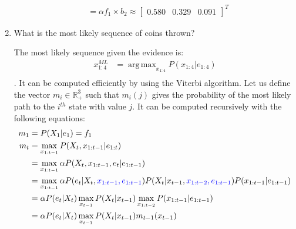 \documentclass[9pt,a4paper]{extarticle}
\DeclareMathOperator*{\argmax}{arg\,max}
\newenvironment{solution}
    {%
    \color{red}
    }
    { 
    \color{black}
    }
\begin{document}
\begin{enumerate}
\begin{solution}
\begin{align}
           &= \alpha f_1\times b_2  \approx 
           \begin{bmatrix}
           0.580 & 0.329 & 0.091
           \end{bmatrix}^T
       \end{align}
       \end{solution}
       \item What is the most likely sequence of coins thrown?
       \begin{solution}
       The most likely sequence given the evidence is:
       \begin{align}
           x^{ML}_{1:4} &= \argmax_{x_{1:4}} P(x_{1:4}|e_{1:4})\\
       \end{align}.
       It can be computed efficiently by using the Viterbi algorithm. Let us define the vector $m_i \in \mathbb{R}^3_+$ such that $m_i(j)$ gives the probability of the most likely path to the $i^{th}$ state with value $j$. It can be computed recursively with the following equations:
       \begin{align}
           m_1 &= P(X_1|e_1) = f_1\\
           m_t &= \max_{x_{1:t-1}}P(X_t, x_{1:t-1}|e_{1:t})\\
           &= \max_{x_{1:t-1}} \alpha P(X_t, x_{1:t-1}, e_{t}|e_{1:t-1})\\
           &= \max_{x_{1:t-1}} \alpha P(e_t|X_t, \textcolor{blue}{x_{1:t-1}, e_{1:t-1}})P(X_t|x_{t-1}, \textcolor{blue}{x_{1:t-2}, e_{1:t-1}})P(x_{1:t-1}|e_{1:t-1})\\
           &=\alpha P(e_t|X_t)\max_{x_{t-1}}P(X_t|x_{t-1})\max_{x_{1:t-2}}P(x_{1:t-1}|e_{1:t-1})\\
           &=\alpha P(e_t|X_t)\max_{x_{t-1}}P(X_t|x_{t-1})m_{t-1}(x_{t-1})
       \end{align}
       \end{solution}
   \end{enumerate}
   
\end{document}
